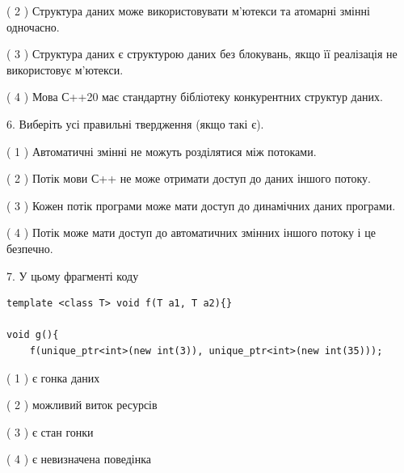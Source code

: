 \documentclass[12pt, ukrainian]{article}
\begin{document}
\begin {large}
{( 2 ) Структура даних може використовувати м’ютекси та атомарні змінні одночасно.%

( 3 ) Структура даних є структурою даних без блокувань, якщо її реалізація не використовує м’ютекси.%

( 4 ) Мова С++20 має стандартну бібліотеку конкурентних структур даних.%
\newpage



\vspace{5mm}
6. Виберіть усі правильні твердження (якщо такі є).\par
\vspace{2mm}

( 1 ) Автоматичні змінні не можуть розділятися між потоками.%

( 2 ) Потік мови С++ не може отримати доступ до даних іншого потоку.%

( 3 ) Кожен потік програми може мати доступ до динамічних даних програми.%

( 4 ) Потік може мати доступ до автоматичних змінних іншого потоку і це безпечно.%


\vspace{5mm}
7. У цьому фрагменті коду
\begin{verbatim}
template <class T> void f(T a1, T a2){}

void g(){
    f(unique_ptr<int>(new int(3)), unique_ptr<int>(new int(35)));
\end{verbatim}

( 1 ) є гонка даних%

( 2 ) можливий виток ресурсів%

( 3 ) є стан гонки%

( 4 ) є невизначена поведінка%
}
\end {large}
\end{document}
